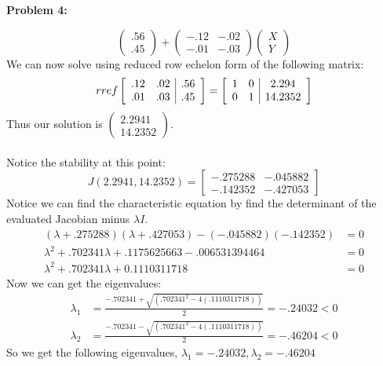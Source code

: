 \documentclass[11pt]{article}
\newenvironment{problem}[1]{\textbf{Problem #1: }}{\newpage}
\begin{document}
\begin{problem}{4}
\begin{enumerate}[label = (\alph*)]
\begin{enumerate}[label = (\roman*)]
\[\begin{pmatrix}
					.56 \\ .45
				\end{pmatrix} + \begin{pmatrix}
					-.12 & -.02 \\
					-.01 & -.03
				\end{pmatrix}\begin{pmatrix}
					X \\ Y
				\end{pmatrix}\]
				We can now solve using reduced row echelon form of the following matrix:
				\[rref \left[\begin{array}{c c | c}
					.12 & .02 & .56 \\
					.01 & .03 & .45
				\end{array}\right] = \left[\begin{array}{c c | c}
				1 & 0 & 2.294 \\
				0 & 1 & 14.2352
				\end{array}\right]\]
				Thus our solution is $\begin{pmatrix}
				2.2941 \\ 14.2352
				\end{pmatrix}$.
				\\ \\
				Notice the stability at this point:
				\[J(2.2941, 14.2352) = \begin{bmatrix}
					-.275288 & -.045882 \\
					-.142352 & -.427053
				\end{bmatrix}\]
				Notice we can find the characteristic equation by find the determinant of the evaluated Jacobian minus $\lambda I$.
				\begin{align*}
					(\lambda + .275288)(\lambda + .427053) - (-.045882)(-.142352) &= 0 \\
					\lambda^2 + .702341 \lambda + .1175625663 - .006531394464 &= 0 \\
					\lambda^2 + .702341 \lambda + 0.1110311718 &= 0 
				\end{align*}
				Now we can get the eigenvalues:
				\begin{align*}
					\lambda_1 &= \frac{-.702341 + \sqrt{(.702341^2 - 4(.1110311718))} }{2} = -.24032 < 0 \\
					\lambda_2 &= \frac{-.702341 - \sqrt{(.702341^2 - 4(.1110311718))} }{2} = -.46204 < 0
				\end{align*}
				So we get the following eigenvalues, $\lambda_1 = -.24032, \lambda_2 = -.46204$
				\\ \\

\end{enumerate}
\end{enumerate}
\end{problem}
\end{document}
